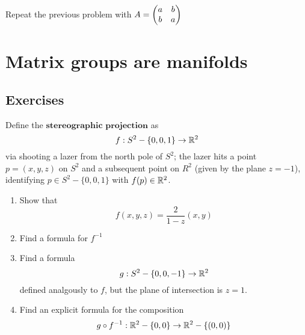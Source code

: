 \documentclass[12pt]{book}
\theoremstyle{definition}
\begin{document}
\begin{taggedexercise}[\textcolor{red}{TODO}]
  Repeat the previous problem with $A = \begin{pmatrix} a & b \\ b & a \end{pmatrix}$
\end{taggedexercise}

\begin{taggedexercise}[\textcolor{red}{TODO}]
  
\end{taggedexercise}

\begin{taggedexercise}[\textcolor{red}{TODO}]
  
\end{taggedexercise}

\begin{taggedexercise}[\textcolor{red}{TODO}]
  
\end{taggedexercise}

\begin{taggedexercise}[\textcolor{red}{TODO}]
  
\end{taggedexercise}

\chapter{Matrix groups are manifolds}
\section{Exercises}

\begin{taggedexercise}[\textcolor{green}{Complete}]
  Define the $\textbf{stereographic projection}$ as 
  \[
  f: S^2 - \{0,0,1\} \to \mathbb{R}^2
  \]
  via shooting a lazer from the north pole of $S^2$; the lazer hits a point $p = (x,y,z)$ on $S^2$ and a subsequent point on $R^2$ (given by the plane $z = -1$), identifying $p \in S^2 - \{0,0,1\}$ with $f(p) \in \mathbb{R}^2$.
  \begin{enumerate}
    \item Show that \[f(x,y,z) = \frac{2}{1-z}(x,y)\]
    \item Find a formula for $f^{-1}$
    \item Find a formula \[g: S^2 - \{0,0,-1\} \to \mathbb{R}^2\] defined analgously to $f$, but the plane of intersection is $z=1$.
    \item Find an explicit formula for the composition \[g \circ f^{-1} : \mathbb{R}^2 - \{0,0\} \to \mathbb{R}^2 - \{(0,0)\}\]
  \end{enumerate}
\end{taggedexercise}
\end{document}
